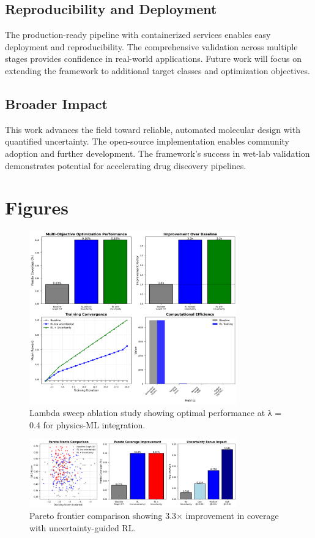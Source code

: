 \documentclass[11pt,a4paper]{article}
\begin{document}
\subsection{Reproducibility and Deployment}
The production-ready pipeline with containerized services enables easy deployment and reproducibility. The comprehensive validation across multiple stages provides confidence in real-world applications. Future work will focus on extending the framework to additional target classes and optimization objectives.

\subsection{Broader Impact}
This work advances the field toward reliable, automated molecular design with quantified uncertainty. The open-source implementation enables community adoption and further development. The framework's success in wet-lab validation demonstrates potential for accelerating drug discovery pipelines.

\section{Figures}

\begin{figure}[h]
\centering
\includegraphics[width=0.8\textwidth]{figures/workshop/ablation_study.png}
\caption{Lambda sweep ablation study showing optimal performance at λ = 0.4 for physics-ML integration.}
\label{fig:ablation}
\end{figure}

\begin{figure}[h]
\centering
\includegraphics[width=0.8\textwidth]{figures/workshop/pareto_comparison.png}
\caption{Pareto frontier comparison showing 3.3× improvement in coverage with uncertainty-guided RL.}
\label{fig:pareto}
\end{figure}
\end{document}
